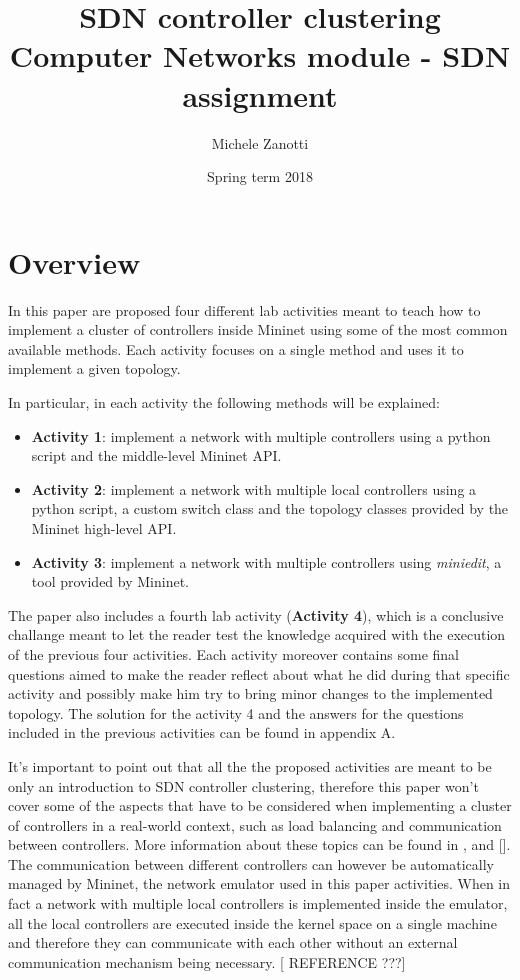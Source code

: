\documentclass[12pt, a4paper]{article}
\title{SDN controller clustering \\ \large Computer Networks module - SDN assignment}
\author{Michele Zanotti}
\date{Spring term 2018}
\begin{document}
\maketitle
\newpage

\section*{Overview}
In this paper are proposed four different lab activities meant to teach how to implement
a cluster of controllers inside Mininet using some of the most common available methods.
Each activity focuses on a single method and uses it to implement a given topology.

In particular, in each activity the following methods will be explained:
\begin{itemize}
  \item \textbf{Activity 1}: implement a network with multiple controllers using a python
  script and the middle-level Mininet API.
  \item \textbf{Activity 2}: implement a network with multiple local controllers using a python
  script, a custom switch class and the topology classes provided by the Mininet high-level API.
  \item \textbf{Activity 3}: implement a network with multiple controllers using
  \emph{miniedit}, a tool provided by Mininet.
\end{itemize}

The paper also includes a fourth lab activity (\textbf{Activity 4}), which is a conclusive challange meant
to let the reader test the knowledge acquired with the execution of the previous
four activities. Each activity moreover contains some final questions aimed to make the reader
reflect about what he did during that specific activity and possibly make him try to
bring minor changes to the implemented topology. The solution
for the activity 4 and the answers for the questions included in the previous activities
can be found in appendix A.

It's important to point out that all the the proposed activities are meant to be
only an introduction to SDN controller clustering, therefore this paper won't cover
some of the aspects that have to be considered when implementing a cluster of
controllers in a real-world context, such as load balancing and communication
between controllers. More information about these topics can be found in
\cite{ref-1}, \cite{ref-2} and [].
The communication between different controllers can however be automatically managed
by Mininet, the network emulator used in this paper activities. When in fact a
network with multiple local controllers is implemented inside the emulator, all
the local controllers are executed inside the kernel space on a single machine
and therefore they can communicate with each other without an external
communication mechanism being necessary. [ REFERENCE ???]
\end{document}
